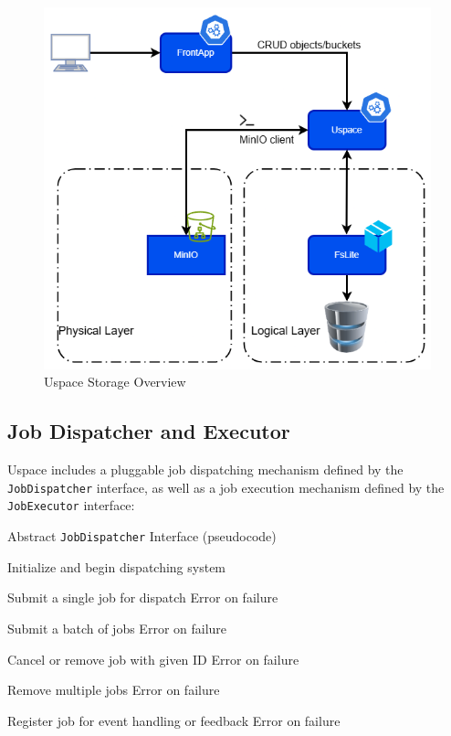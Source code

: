 \begin{figure}[h]
  \centering
  \includegraphics[width=1\textwidth]{Images/UspaceBlockDiagram.drawio.png}
  \caption{Uspace Storage Overview}
  \label{fig:uspace-storage-overview}
\end{figure}

\subsection{Job Dispatcher and Executor}

Uspace includes a pluggable job dispatching mechanism defined by the \texttt{JobDispatcher} interface,
as well as a job execution mechanism defined by the \texttt{JobExecutor} interface:

\begin{algorithm}[H]
\caption{Abstract \texttt{JobDispatcher} Interface (pseudocode)}
\label{alg:job-dispatcher}
\begin{algorithmic}[1]

  \State Initialize and begin dispatching system
\EndFunction

  \State Submit a single job for dispatch
  \State \Return Error on failure
\EndFunction

  \State Submit a batch of jobs
  \State \Return Error on failure
\EndFunction

  \State Cancel or remove job with given ID
  \State \Return Error on failure
\EndFunction

  \State Remove multiple jobs
  \State \Return Error on failure
\EndFunction

  \State Register job for event handling or feedback
  \State \Return Error on failure
\EndFunction

\end{algorithmic}
\end{algorithm}

